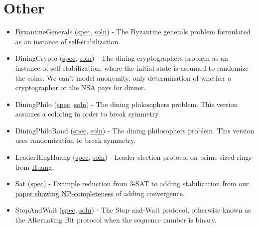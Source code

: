 
\section{Other}

\begin{itemize}
\item ByzantineGenerals (\href{\examplespec/ByzantineGenerals.prot}{spec}, \href{\examplesoln/ByzantineGenerals.prot}{soln})
- The Byzantine generals problem formulated as an instance of self-stabilization.
\item DiningCrypto (\href{\examplespec/DiningCrypto.prot}{spec}, \href{\examplesoln/DiningCrypto.prot}{soln})
- The dining cryptographers problem as an instance of self-stabilization, where the initial state is assumed to randomize the coins.
We can't model anonymity, only determination of whether a cryptographer or the NSA pays for dinner.
\item DiningPhilo (\href{\examplespec/DiningPhilo.prot}{spec}, \href{\examplesoln/DiningPhilo.prot}{soln})
- The dining philosophers problem. This version assumes a coloring in order to break symmetry.
\item DiningPhiloRand (\href{\examplespec/DiningPhiloRand.prot}{spec}, \href{\examplesoln/DiningPhiloRand.prot}{soln})
- The dining philosophers problem. This version uses randomization to break symmetry.
\item LeaderRingHuang (\href{\examplespec/LeaderRingHuang.prot}{spec}, \href{\examplesoln/LeaderRingHuang.prot}{soln})
- Leader election protocol on prime-sized rings from \href{http://dx.doi.org/10.1145/169683.174161}{Huang}.
\item Sat (\href{\examplespec/Sat.prot}{spec})
- Example reduction from 3-SAT to adding stabilization from our \href{http://dx.doi.org/10.1007/978-3-642-40213-5_2}{paper showing NP-completeness} of adding convergence.
\item StopAndWait (\href{\examplespec/StopAndWait.prot}{spec}, \href{\examplesoln/StopAndWait.prot}{soln})
- The Stop-and-Wait protocol, otherwise known as the Alternating Bit protocol when the sequence number is binary.
\end{itemize}



